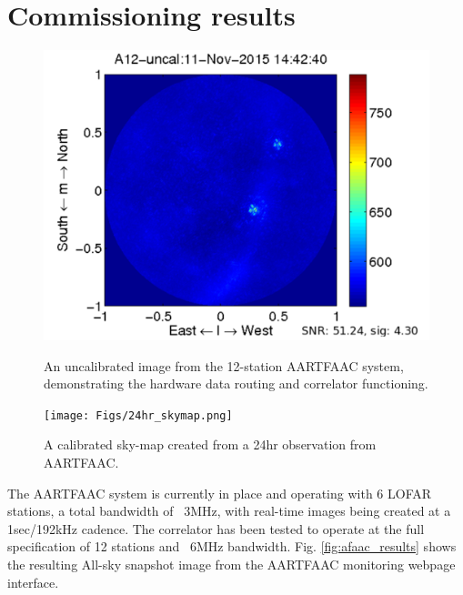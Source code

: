 \documentclass{ws-jai}
\begin{document}
\section {\label{sec:results} Commissioning results}
\begin{figure}[htbp]
 \begin {minipage}{\textwidth}
   \includegraphics[width=\textwidth]{Figs/A12_uncal.png}
\caption{An uncalibrated image from the 12-station AARTFAAC system, demonstrating the hardware data routing and  correlator functioning.}
\label{fig:afaac_results}
 \end {minipage}
 
\begin {minipage}{\textwidth}
   \texttt{[image: Figs/24hr\_skymap.png]}
\caption{A calibrated sky-map created from a 24hr observation from AARTFAAC.}
\label{fig:afaac_24hr}
 \end {minipage}
  
\end{figure}
The AARTFAAC system is currently in place and operating with 6 LOFAR stations, a
total bandwidth of  ~3MHz, with real-time images being created  at a 1sec/192kHz
cadence. The correlator has been tested  to operate at the full specification of
12  stations  and  ~6MHz  bandwidth.  Fig.   \ref{fig:afaac_results}  shows  the
resulting All-sky snapshot image from the AARTFAAC monitoring webpage interface.

\end{document}
